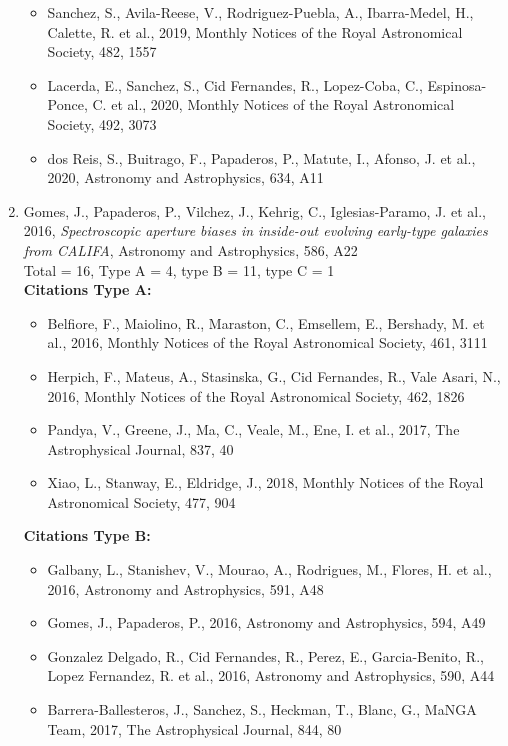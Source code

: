 \documentclass{letter}
\begin{document}
\begin{enumerate}
\begin{itemize}
\item Sanchez, S., Avila-Reese, V., Rodriguez-Puebla, A., Ibarra-Medel, H., Calette, R. et al., 2019, Monthly Notices of the Royal Astronomical Society, 482, 1557
\item Lacerda, E., Sanchez, S., Cid Fernandes, R., Lopez-Coba, C., Espinosa-Ponce, C. et al., 2020, Monthly Notices of the Royal Astronomical Society, 492, 3073
\item dos Reis, S., Buitrago, F., Papaderos, P., Matute, I., Afonso, J. et al., 2020, Astronomy and Astrophysics, 634, A11
\end{itemize}
\item Gomes, J., Papaderos, P., Vilchez, J., Kehrig, C., Iglesias-Paramo, J. et al., 2016, {\it Spectroscopic aperture biases in inside-out evolving early-type galaxies from CALIFA}, Astronomy and Astrophysics, 586, A22 \\ 
Total = 16, Type A = 4, type B = 11, type C = 1 \\ 
{\bf Citations Type A:}
\begin{itemize}
\item Belfiore, F., Maiolino, R., Maraston, C., Emsellem, E., Bershady, M. et al., 2016, Monthly Notices of the Royal Astronomical Society, 461, 3111
\item Herpich, F., Mateus, A., Stasinska, G., Cid Fernandes, R., Vale Asari, N., 2016, Monthly Notices of the Royal Astronomical Society, 462, 1826
\item Pandya, V., Greene, J., Ma, C., Veale, M., Ene, I. et al., 2017, The Astrophysical Journal, 837, 40
\item Xiao, L., Stanway, E., Eldridge, J., 2018, Monthly Notices of the Royal Astronomical Society, 477, 904
\end{itemize}
{\bf Citations Type B:}
\begin{itemize}
\item Galbany, L., Stanishev, V., Mourao, A., Rodrigues, M., Flores, H. et al., 2016, Astronomy and Astrophysics, 591, A48
\item Gomes, J., Papaderos, P., 2016, Astronomy and Astrophysics, 594, A49
\item Gonzalez Delgado, R., Cid Fernandes, R., Perez, E., Garcia-Benito, R., Lopez Fernandez, R. et al., 2016, Astronomy and Astrophysics, 590, A44
\item Barrera-Ballesteros, J., Sanchez, S., Heckman, T., Blanc, G., MaNGA Team, 2017, The Astrophysical Journal, 844, 80

\end{itemize}
\end{enumerate}
\end{document}
